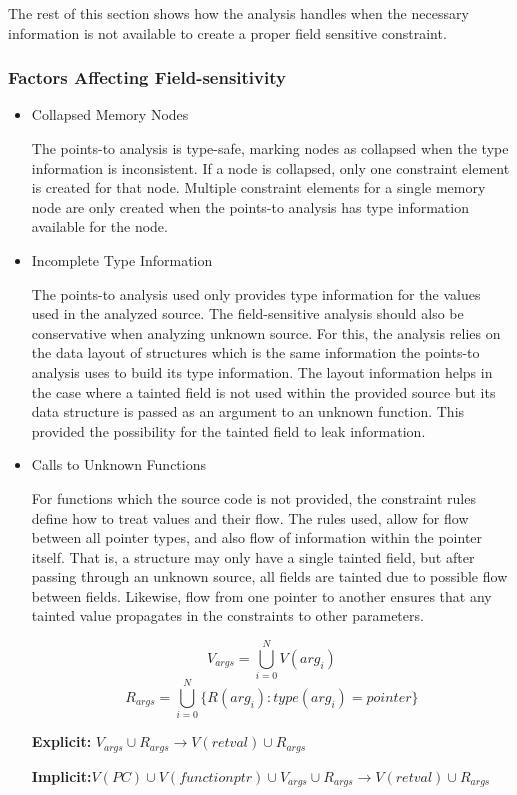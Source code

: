  The rest of this section shows how the analysis handles when the necessary
 information is not available to create a proper field sensitive constraint.

\subsubsection{Factors Affecting Field-sensitivity}
\begin{itemize}
\item{Collapsed Memory Nodes}

   The points-to analysis is type-safe, marking nodes as collapsed when the type
   information is inconsistent. If a node is collapsed, only one constraint
   element is created for that node. Multiple constraint elements for a single
   memory node are only created when the points-to analysis has type information
   available for the node.

\item{Incomplete Type Information}
 
   The points-to analysis used only provides type information for the values used
   in the analyzed source. The field-sensitive analysis should also be
   conservative when analyzing unknown source. For this, the analysis relies on
   the data layout of structures which is the same information the points-to
   analysis uses to build its type information. The layout information helps in
   the case where a tainted field is not used within the provided source but its
   data structure is passed as an argument to an unknown function. This provided
   the possibility for the tainted field to leak information.

\item{Calls to Unknown Functions}

For functions which the source code is not provided, the constraint rules define
how to treat values and their flow. The rules used, allow for flow between all
pointer types, and also flow of information within the pointer itself. That is,
a structure may only have a single tainted field, but after passing through an
unknown source, all fields are tainted due to possible flow between fields.
Likewise, flow from one pointer to another ensures that any tainted value
propagates in the constraints to other parameters.

\[V_{args} = \bigcup_{i=0}^N V(arg_i)\]
\[R_{args} = \bigcup_{i=0}^{N}\{R(arg_i) : type(arg_i) = pointer\}\]

\noindent
\textbf{Explicit:} $V_{args} \cup R_{args} \rightarrow V(retval) \cup R_{args}$

\noindent
\textbf{Implicit:}$V(PC) \cup V(functionptr) \cup V_{args} \cup R_{args} \rightarrow V(retval) \cup R_{args}$
\end{itemize}  

